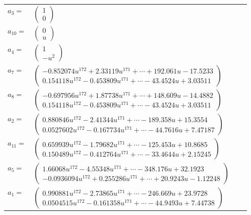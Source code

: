 \documentclass[1p]{elsarticle_modified}
\theoremstyle{definition}
\begin{document}
\begin{tabular}{m{7pt} m{180pt} m{7pt} m{180pt} }
\flushright $a_{3}=$&$\begin{pmatrix}1\\0\end{pmatrix}$ \\
\flushright $a_{10}=$&$\begin{pmatrix}0\\u\end{pmatrix}$ \\
\flushright $a_{4}=$&$\begin{pmatrix}1\\- u^2\end{pmatrix}$ \\
\flushright $a_{7}=$&$\begin{pmatrix}-0.852074 u^{172}+2.33119 u^{171}+\cdots+192.061 u-17.5233\\0.154118 u^{172}-0.453809 u^{171}+\cdots-43.4524 u+3.03511\end{pmatrix}$ \\
\flushright $a_{8}=$&$\begin{pmatrix}-0.697956 u^{172}+1.87738 u^{171}+\cdots+148.609 u-14.4882\\0.154118 u^{172}-0.453809 u^{171}+\cdots-43.4524 u+3.03511\end{pmatrix}$ \\
\flushright $a_{2}=$&$\begin{pmatrix}0.880846 u^{172}-2.41344 u^{171}+\cdots-189.358 u+15.3554\\0.0527602 u^{172}-0.167734 u^{171}+\cdots-44.7616 u+7.47187\end{pmatrix}$ \\
\flushright $a_{11}=$&$\begin{pmatrix}0.659939 u^{172}-1.79682 u^{171}+\cdots-125.453 u+10.8685\\0.150489 u^{172}-0.412764 u^{171}+\cdots-33.4644 u+2.15245\end{pmatrix}$ \\
\flushright $a_{5}=$&$\begin{pmatrix}1.66068 u^{172}-4.55348 u^{171}+\cdots-348.176 u+32.1923\\-0.0936094 u^{172}+0.255286 u^{171}+\cdots+20.9243 u-1.12248\end{pmatrix}$ \\
\flushright $a_{1}=$&$\begin{pmatrix}0.990881 u^{172}-2.73865 u^{171}+\cdots-246.669 u+23.9728\\0.0504515 u^{172}-0.161358 u^{171}+\cdots-44.9493 u+7.44738\end{pmatrix}$ \\

\end{tabular}
\end{document}
